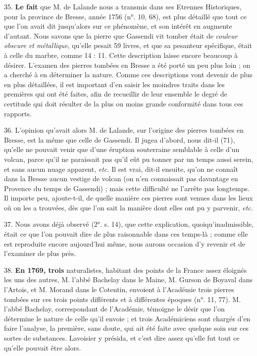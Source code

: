 \documentclass[a4paper, 11pt, oneside, polutonikogreek, french]{article}
\begin{document}
35. \textbf{Le fait} que M. de Lalande nous a transmis dans ses Etrennes Historiques, pour la province de Bresse, année 1756 (n°. 10, 68), est plus détaillé que tout ce que l'on avait dit jusqu'alors sur ce phénomène, et son intérêt en augmente d'autant. Nous savons que la pierre que Gassendi vit tomber était de \emph{couleur obscure et métallique}, qu'elle pesait 59 livres, et que sa pesanteur spécifique, était à celle du marbre, comme 14 : 11. Cette description laisse encore beaucoup à désirer. L'examen des pierres tombées en Bresse a été porté un peu plus loin ; on a cherché à en déterminer la nature. Comme ces descriptions vont devenir de plus en plus détaillées, il est important d'en saisir les moindres traits dans les premières qui ont été faites, afin de recueillir de leur ensemble le degré de certitude qui doit résulter de la plus ou moins grande conformité dans tous ces rapports.

36. L'opinion qu'avait alors M. de Lalande, sur l'origine des pierres tombées en Bresse, est la même que celle de Gassendi. Il jugea d'abord, nous dit-il (71), qu'elle ne pouvait venir que d'une éruption souterraine semblable à celle d'un volcan, parce qu'il ne paraissait pas qu'il eût pu tonner par un temps aussi serein, et sans aucun nuage apparent, \emph{etc.} \og Il est vrai, dit-il ensuite, qu'on ne connaît dans la Bresse aucun vestige de volcan (on n'en connaissait pas davantage en Provence du temps de Gassendi) ; mais cette difficulté ne l'arrête pas longtemps. \fg Il importe peu, ajoute-t-il, \og de quelle manière ces pierres sont venues dans les lieux où on les a trouvées, dès que l'on sait la manière dont elles ont pu y parvenir, \emph{etc.} \fg

37. Nous avons déjà observé (2°. s. 14), que cette explication, quoiqu'inadmissible, était ce que l'on pouvait dire de plus raisonnable dans ces temps-là ; comme elle est reproduite encore aujourd'hui même, nous aurons occasion d'y revenir et de l'examiner de plus près.

38. \textbf{En 1769, trois} naturalistes, habitant des points de la France assez éloignés les uns des autres, M. l'abbé Bachelay dans le Maine, M. Gurson de Boyaval dans l'Artois, et M. Morand dans le Cotentin, envoient à l'Académie trois pierres tombées sur ces trois points différents et à différentes époques (n°. 11, 77). M. l'abbé Bachelay, correspondant de l'Académie, témoigne le désir que l'on détermine le nature de celle qu'il envoie ; et trois Académiciens sont chargés d'en faire l'analyse, la première, sans doute, qui ait été faite avec quelque soin sur ces sortes de substances. Lavoisier y présida, et c'est dire assez qu'elle fut tout ce qu'elle pouvait être alors.
\end{document}
